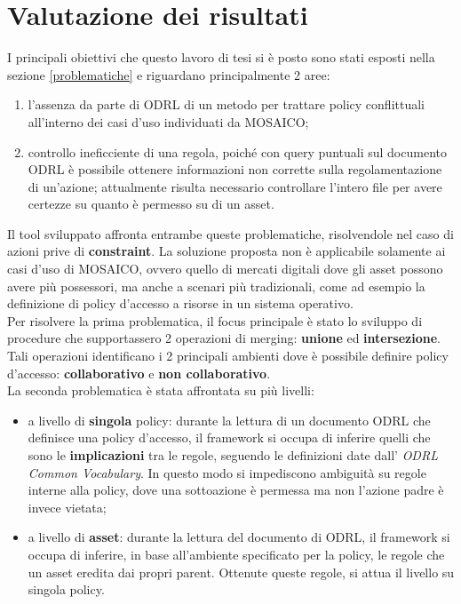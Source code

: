 \documentclass[12pt,a4paper,twoside]{book}
\begin{document}
\chapter{Valutazione dei risultati}
I principali obiettivi che questo lavoro di tesi si è posto sono stati esposti nella sezione \ref{problematiche} e riguardano principalmente 2 aree:
\begin{enumerate}
\item l'assenza da parte di ODRL di un metodo per trattare policy conflittuali all'interno dei casi d'uso individuati da MOSAICO;
\item controllo ineficciente di una regola, poiché con query puntuali sul documento ODRL è possibile ottenere informazioni non corrette sulla regolamentazione di un'azione; attualmente risulta necessario controllare l'intero file per avere certezze su quanto è permesso su di un asset.
\end{enumerate}
Il tool sviluppato affronta entrambe queste problematiche, risolvendole nel caso di azioni prive di \textbf{constraint}. La soluzione proposta non è applicabile solamente ai casi d'uso di MOSAICO, ovvero quello di mercati digitali dove gli asset possono avere più possessori, ma anche a scenari più tradizionali, come ad esempio la definizione di policy d'accesso a risorse in un sistema operativo.\\
Per risolvere la prima problematica, il focus principale è stato lo sviluppo di procedure che supportassero 2 operazioni di merging: \textbf{unione} ed \textbf{intersezione}. Tali operazioni identificano i 2 principali ambienti dove è possibile definire policy d'accesso: \textbf{collaborativo} e \textbf{non collaborativo}.\\
La seconda problematica è stata affrontata su più livelli:
\begin{itemize}
\item a livello di \textbf{singola} policy: durante la lettura di un documento ODRL che definisce una policy d'accesso, il framework si occupa di inferire quelli che sono le \textbf{implicazioni} tra le regole, seguendo le definizioni date dall' \textit{ODRL Common Vocabulary}. In questo modo si impediscono ambiguità su regole interne alla policy, dove una sottoazione è permessa ma non l'azione padre è invece vietata;
\item a livello di \textbf{asset}: durante la lettura del documento di ODRL, il framework si occupa di inferire, in base all'ambiente specificato per la policy, le regole che un asset eredita dai propri parent. Ottenute queste regole, si attua il livello su singola policy.
\end{itemize}
\end{document}
